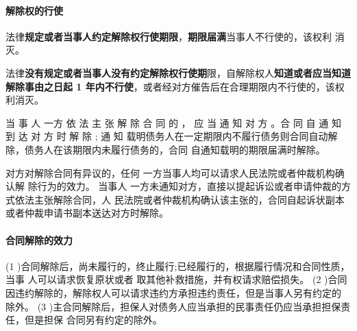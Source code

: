 \documentclass[UTF8,12pt]{ctexart}
\numberwithin{equation}{section} %
\numberwithin{figure}{section}
\numberwithin{table}{section}
\begin{document}
	\paragraph{解除权的行使}
	法律\textbf{规定或者当事人约定解除权行使期限}，\textbf{期限届满}当事人不行使的，该权利 消灭。
	
	法律\textbf{没有规定或者当事人没有约定解除权行使期}限，自解除权人\textbf{知道或者应当知道解除事由之日起 1 年内不行使}，或者经对方催告后在合理期限内不行使的，该权利消灭。
	
	当 事 人 一方 依 法 主 张 解 除 合 同 的 ， 应 当 通 知 对 方 。合 同 自 通 知 到 达 对 方 时 解 除 ; 通 知 载明债务人在一定期限内不履行债务则合同自动解除，债务人在该期限内未履行债务的，合同 自通知载明的期限届满时解除。
	
	对方对解除合同有异议的，任何 一方当事人均可以请求人民法院或者仲裁机构确认解 除行为的效力。
	当事人 一方未通知对方，直接以提起诉讼或者申请仲裁的方式依法主张解除合同，人 民法院或者仲裁机构确认该主张的，合同自起诉状副本或者仲裁申请书副本送达对方时解除。 
	
	\paragraph{合同解除的效力}
	(1 )合同解除后，尚未履行的，终止履行;已经履行的，根据履行情况和合同性质，当事 人可以请求恢复原状或者 取其他补救措施，并有权请求赔偿损失。
	(2 )合同因违约解除的，解除权人可以请求违约方承担违约责任，但是当事人另有约定的 除外。
	(3 )主合同解除后，担保人对债务人应当承担的民事责任仍应当承担担保责任，但是担保 合同另有约定的除外。
	
\end{document}
